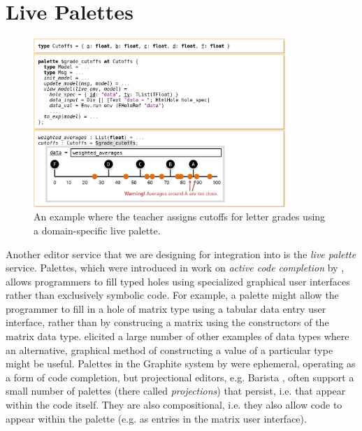 
\section{Live Palettes}
\label{sec:palettes}


\begin{figure}[t]
\includegraphics[width=0.85\textwidth]{images/cutoffs-new.png}
\caption{An example where the teacher assigns cutoffs 
for letter grades using a domain-specific live palette.}
\label{fig:cutoffs-example}
\end{figure}

Another editor service that we are designing for integration into \Hazel 
is the \emph{live palette} service. 
Palettes, which were introduced in work on
\emph{active code completion} by \citet{ActiveCodeCompletion},  allows programmers to fill typed 
holes using specialized graphical user interfaces rather than exclusively symbolic
code. For example, a palette might allow the programmer to 
fill in a hole of matrix type using a tabular data entry 
user interface, rather than by construcing a matrix 
using the constructors of the matrix data type. \citet{ActiveCodeCompletion} elicited a large number of other
examples of data types where an alternative, graphical 
method of constructing a value of a particular type might be
useful.
Palettes in the Graphite system by \citet{ActiveCodeCompletion} 
were ephemeral, operating as a form of code completion, but projectional editors, e.g. Barista \cite{ko_barista:_2006}, often support a small number of  
palettes (there called \emph{projections}) that persist, i.e. that appear within the code itself.
They are also compositional, i.e. they also allow code to appear within the palette (e.g. as entries in the matrix user interface). 

